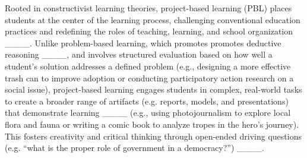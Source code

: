 Rooted in constructivist learning theories, project-based learning (PBL) places students at the center of the learning process, challenging conventional education practices and redefining the roles of teaching, learning, and school organization ____.  
Unlike problem-based learning, which promotes promotes deductive reasoning ____, and involves structured evaluation based on how well a student’s solution addresses a defined problem (e.g., designing a more effective trash can to improve adoption or conducting participatory action research on a social issue), project-based learning engages students in complex, real-world tasks to create a broader range of artifacts (e.g. reports, models, and presentations) that demonstrate learning ____ (e.g., using photojournalism to explore local flora and fauna or writing a comic book to analyze tropes in the hero’s journey). 
This fosters creativity and critical thinking through open-ended driving questions (e.g. “what is the proper role of government in a democracy?”) ____.
